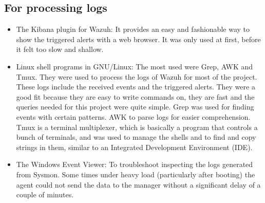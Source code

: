 \subsection{For processing logs}
\begin{itemize}
	\item The Kibana plugin for Wazuh: It provides an easy and fashionable way to show the triggered alerts with a web browser. It was only used at first, before it felt too slow and shallow.
	\item Linux shell programs in GNU/Linux: The most used were Grep, AWK and Tmux. They were used to process the logs of Wazuh for most of the project. These logs include the received events and the triggered alerts. They were a good fit because they are easy to write commands on, they are fast and the queries needed for this project were quite simple. Grep was used for finding events with certain patterns. AWK to parse logs for easier comprehension. Tmux is a terminal multiplexer, which is basically a program that controls a bunch of terminals, and was used to manage the shells and to find and copy strings in them, similar to an Integrated Development Environment (IDE).
	\item The Windows Event Viewer: To troubleshoot inspecting the logs generated from Sysmon. Some times under heavy load (particularly after booting) the agent could not send the data to the manager without a significant delay of a couple of minutes.
\end{itemize}

